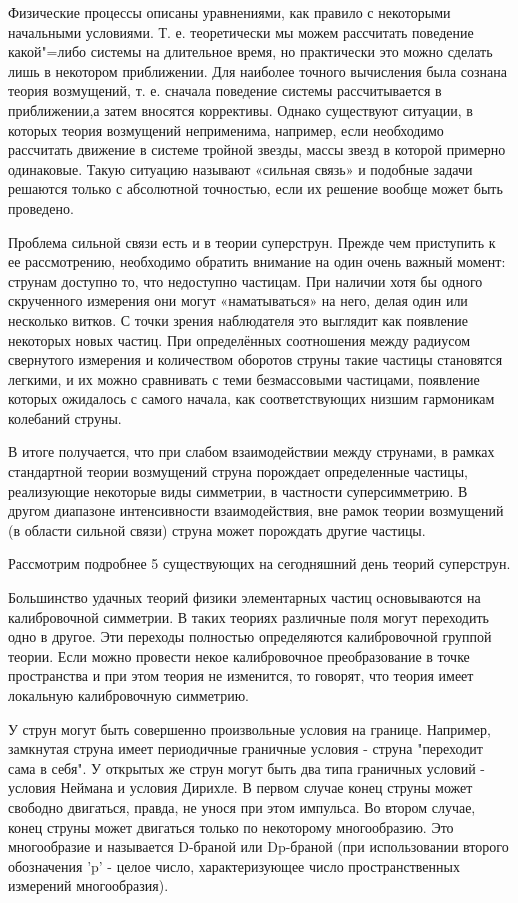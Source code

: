 Физические процессы описаны уравнениями, как правило с некоторыми начальными условиями.
Т. е. теоретически мы можем рассчитать поведение какой"=либо системы на длительное время,
но практически это можно сделать лишь в некотором приближении.
Для наиболее точного вычисления была сознана теория возмущений,
т. е. сначала поведение системы рассчитывается в приближении,а затем вносятся коррективы.
Однако существуют ситуации, в которых теория возмущений неприменима,
например, если необходимо рассчитать движение в системе тройной звезды,
массы звезд в которой примерно одинаковые.
Такую ситуацию называют «сильная связь» и подобные задачи решаются только с абсолютной точностью,
если их решение вообще может быть проведено. 

Проблема сильной связи есть и в теории суперструн. Прежде чем приступить к ее рассмотрению, необходимо обратить внимание на один очень важный момент: струнам доступно то, что недоступно частицам.
При наличии хотя бы одного скрученного измерения они могут «наматываться» на него, делая один или несколько витков.
С точки зрения наблюдателя это выглядит как появление некоторых новых частиц.
При определённых соотношения между радиусом свернутого измерения и количеством оборотов струны такие частицы становятся легкими,
и их можно сравнивать с теми безмассовыми частицами, появление которых ожидалось с самого начала,
как соответствующих низшим гармоникам колебаний струны.

В итоге получается, что при слабом взаимодействии между струнами, в рамках стандартной теории возмущений струна порождает определенные частицы, реализующие некоторые виды симметрии, в частности суперсимметрию. В другом диапазоне интенсивности взаимодействия, вне рамок теории возмущений (в области сильной связи) струна может порождать другие частицы.

Рассмотрим подробнее 5 существующих на сегодняшний день теорий суперструн.

Большинство удачных теорий физики элементарных частиц основываются на калибровочной симметрии. В таких теориях различные поля могут переходить одно в другое. Эти переходы полностью определяются калибровочной группой теории. Если можно провести некое калибровочное преобразование в точке пространства и при этом теория не изменится, то говорят, что теория имеет локальную калибровочную симметрию.

У струн могут быть совершенно произвольные условия на границе. Например, замкнутая струна имеет периодичные граничные условия - струна "переходит сама в себя". У открытых же струн могут быть два типа граничных условий - условия Неймана и условия Дирихле. В первом случае конец струны может свободно двигаться, правда, не унося при этом импульса. Во втором  случае, конец струны может двигаться только по некоторому многообразию. Это многообразие и называется D-браной или Dp-браной (при использовании второго обозначения 'p' - целое число, характеризующее число пространственных измерений многообразия).

